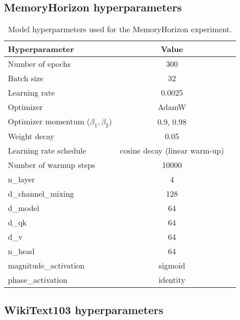 \documentclass{article} \usepackage{iclr2024_conference,times}
\begin{document}
\subsection{MemoryHorizon hyperparameters}\label{subsec:memory_horizon_hyperparams}

\begin{table}[H]
    \caption{Model hyperparmeters used for the MemoryHorizon experiment.}
    \centering
    \begin{tabular}{lcc}
        \toprule
        Hyperparameter & Value \\
        \midrule
        Number of epochs & 300 \\
        Batch size & 32 \\
        Learning rate & 0.0025 \\
        Optimizer & AdamW \\
        Optimizer momentum ($\beta_1, \beta_2$) & 0.9, 0.98 \\
        Weight decay & 0.05 \\
        Learning rate schedule & cosine decay (linear warm-up) \\
        Number of warmup steps & 10000 \\
        \midrule
        n\_layer & 4 \\
        d\_channel\_mixing & 128 \\
        d\_model & 64 \\
        d\_qk & 64 \\
        d\_v & 64 \\
        n\_head & 64 \\
        magnitude\_activation & sigmoid \\
        phase\_activation & identity \\
        \bottomrule
    \end{tabular}
    \label{table:general_hparams}
\end{table}

\subsection{WikiText103 hyperparameters}\label{sec:wikitext103_hyperparameters}
\end{document}
